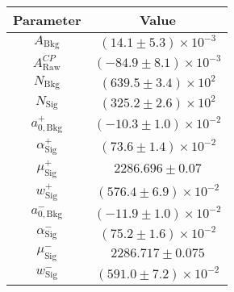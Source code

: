 \begin{tabular}{cc}
  \toprule
  Parameter & Value \\
  \midrule
$A_{\mathrm{Bkg}}$ & $(14.1 \pm 5.3) \times 10^{-3}$ \\
$A_{\mathrm{Raw}}^{C\!P}$ & $(-84.9 \pm 8.1) \times 10^{-3}$ \\
$N_{\mathrm{Bkg}}$ & $(639.5 \pm 3.4) \times 10^{2}$ \\
$N_{\mathrm{Sig}}$ & $(325.2 \pm 2.6) \times 10^{2}$ \\
$a_{0,\mathrm{Bkg}}^{+}$ & $(-10.3 \pm 1.0) \times 10^{-2}$ \\
$\alpha_{\mathrm{Sig}}^{+}$ & $(73.6 \pm 1.4) \times 10^{-2}$ \\
$\mu_{\mathrm{Sig}}^{+}$ & $2286.696 \pm 0.07$ \\
$w_{\mathrm{Sig}}^{+}$ & $(576.4 \pm 6.9) \times 10^{-2}$ \\
$a_{0,\mathrm{Bkg}}^{-}$ & $(-11.9 \pm 1.0) \times 10^{-2}$ \\
$\alpha_{\mathrm{Sig}}^{-}$ & $(75.2 \pm 1.6) \times 10^{-2}$ \\
$\mu_{\mathrm{Sig}}^{-}$ & $2286.717 \pm 0.075$ \\
$w_{\mathrm{Sig}}^{-}$ & $(591.0 \pm 7.2) \times 10^{-2}$ \\
  \bottomrule
\end{tabular}